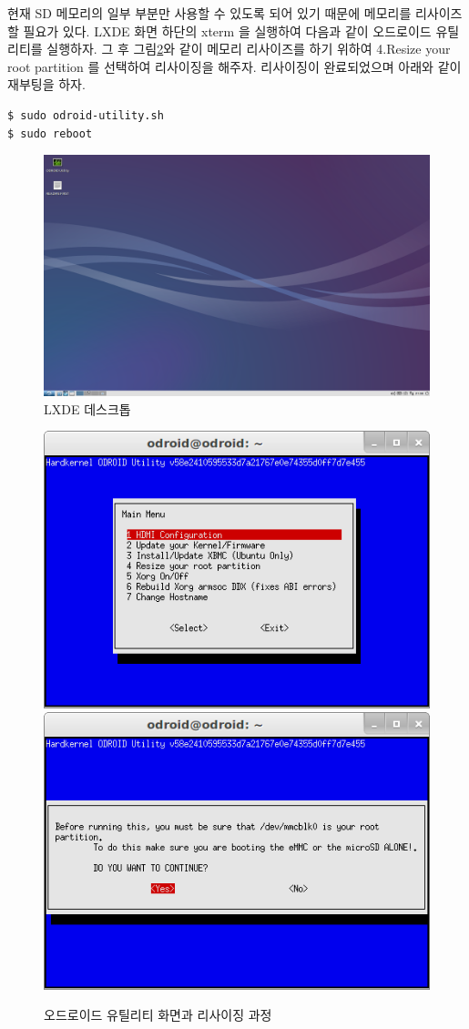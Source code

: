 현재 SD 메모리의 일부 부분만 사용할 수 있도록 되어 있기 때문에 메모리를 리사이즈 할 필요가 있다. LXDE 화면 하단의 xterm 을 실행하여 다음과 같이 오드로이드 유틸리티를 실행하자. 그 후 그림\ref{fig:odroid_utility}와 같이 메모리 리사이즈를 하기 위하여 4.Resize your root partition 를 선택하여 리사이징을 해주자. 리사이징이 완료되었으며 아래와 같이 재부팅을 하자.

\begin{lstlisting}[language=ROS]
$ sudo odroid-utility.sh 
$ sudo reboot 
\end{lstlisting}

\begin{figure}[h]
\centering\includegraphics[width=0.7\columnwidth]{pictures/chapter3/odroid_LXDE.png}
\caption{LXDE 데스크톱}
\label{fig:lxde}
\end{figure}

\begin{figure}[h]
\centering
\includegraphics[width=0.49\columnwidth]{pictures/chapter3/odroid_option1.png}
\includegraphics[width=0.49\columnwidth]{pictures/chapter3/odroid_option2.png}
\caption{오드로이드 유틸리티 화면과 리사이징 과정}
\label{fig:odroid_utility}
\end{figure}

